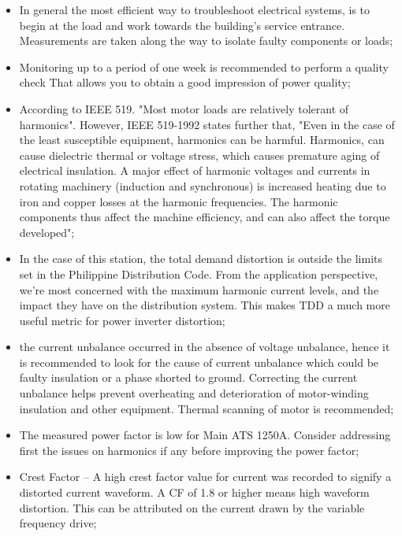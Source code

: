 \begin{itemize}
	
	\item In general the most efficient way to troubleshoot electrical systems, is to begin at
	the load and work towards the building’s service entrance. Measurements are taken along the way to isolate faulty components or loads;
	
	\item 	Monitoring up to a period of one week is recommended to perform a quality check 
	That allows you to obtain a good impression of power quality; 
	
	\item 	According to IEEE 519. "Most motor loads are relatively tolerant of harmonics". However, IEEE 519-1992 states further that, "Even in the case of the least susceptible equipment, harmonics can be harmful. Harmonics, can cause dielectric thermal or voltage stress, which causes premature aging of electrical insulation. A major effect of harmonic voltages and currents in rotating machinery (induction and synchronous) is increased heating due to iron and copper losses at the harmonic frequencies. The harmonic components thus affect the machine efficiency, and can also affect the torque developed"; 
	
	\item  	In the case of this station, the total demand distortion is outside the limits set in the Philippine Distribution Code. From the application perspective, we're most concerned with the maximum harmonic current levels, and the impact they have on the distribution system. This makes TDD a much more useful metric for power inverter distortion; 
	
	\item  the current unbalance occurred in the absence of voltage unbalance, hence it is recommended to look for the cause of current unbalance which could be faulty insulation or a phase shorted to ground. Correcting the current unbalance helps prevent overheating and deterioration of motor-winding insulation and other equipment. Thermal scanning of motor is recommended;
	
	\item The measured power factor is low for Main ATS 1250A. Consider addressing first the issues on harmonics if any before improving the power factor;
	
	\item 	Crest Factor – A high crest factor value for current was recorded to signify a   distorted current waveform. A CF of 1.8 or higher means high waveform distortion. This can be attributed on the current drawn by the variable frequency drive;
	

\end{itemize}
